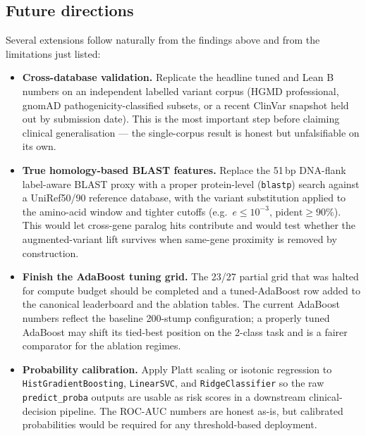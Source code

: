 \documentclass[11pt,a4paper]{article}
\begin{document}
\subsection{Future directions}
\label{sec:future}

Several extensions follow naturally from the findings above and from the
limitations just listed:

\begin{itemize}[leftmargin=*]
    \item \textbf{Cross-database validation.} Replicate the headline tuned
          and Lean B numbers on an independent labelled variant corpus
          (HGMD professional, gnomAD pathogenicity-classified subsets, or
          a recent ClinVar snapshot held out by submission date). This is
          the most important step before claiming clinical generalisation
          — the single-corpus result is honest but unfalsifiable on its
          own.
    \item \textbf{True homology-based BLAST features.} Replace the
          51\,bp DNA-flank label-aware BLAST proxy with a proper
          protein-level (\texttt{blastp}) search against a UniRef50/90
          reference database, with the variant substitution applied to
          the amino-acid window and tighter cutoffs (e.g.\ $e \le 10^{-3}$,
          $\text{pident} \ge 90\%$). This would let cross-gene paralog
          hits contribute and would test whether the augmented-variant
          lift survives when same-gene proximity is removed by
          construction.
    \item \textbf{Finish the AdaBoost tuning grid.} The 23/27 partial
          grid that was halted for compute budget should be completed
          and a tuned-AdaBoost row added to the canonical leaderboard
          and the ablation tables. The current AdaBoost numbers reflect
          the baseline 200-stump configuration; a properly tuned
          AdaBoost may shift its tied-best position on the 2-class task
          and is a fairer comparator for the ablation regimes.
    \item \textbf{Probability calibration.} Apply Platt scaling or
          isotonic regression to \texttt{HistGradientBoosting},
          \texttt{LinearSVC}, and \texttt{RidgeClassifier} so the raw
          \texttt{predict\_proba} outputs are usable as risk scores in a
          downstream clinical-decision pipeline. The ROC-AUC numbers
          are honest as-is, but calibrated probabilities would be
          required for any threshold-based deployment.

\end{itemize}
\end{document}

